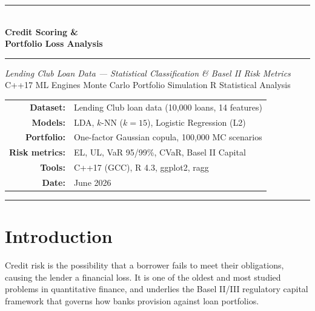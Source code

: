 \documentclass[12pt,a4paper]{article}
\begin{document}

\begin{titlepage}\centering
  \vspace*{2cm}
  {\color{darkblue}\rule{\textwidth}{2pt}}\\[0.4cm]
  {\Huge\bfseries\color{darkblue} Credit Scoring \&\\[0.3cm]Portfolio Loss Analysis}\\[0.4cm]
  {\color{midblue}\rule{\textwidth}{2pt}}
  \vspace{1.2cm}
  {\Large\itshape Lending Club Loan Data --- Statistical Classification \& Basel II Risk Metrics}
  \vspace{0.8cm}\\
  {\large\color{gray} C++17 ML Engines \quad\textbullet\quad Monte Carlo Portfolio Simulation \quad\textbullet\quad R Statistical Analysis}
  \vspace{2.5cm}

  \begin{tabular}{rl}
    \textbf{Dataset:}      & Lending Club loan data (10,000 loans, 14 features) \\[4pt]
    \textbf{Models:}       & LDA, $k$-NN ($k=15$), Logistic Regression (L2) \\[4pt]
    \textbf{Portfolio:}    & One-factor Gaussian copula, 100,000 MC scenarios \\[4pt]
    \textbf{Risk metrics:} & EL, UL, VaR 95/99\%, CVaR, Basel II Capital \\[4pt]
    \textbf{Tools:}        & C++17 (GCC), R 4.3, ggplot2, ragg \\[4pt]
    \textbf{Date:}         & June 2026
  \end{tabular}

  \vfill{\color{midblue}\rule{0.5\textwidth}{0.8pt}}
\end{titlepage}

\tableofcontents\newpage

\section{Introduction}

Credit risk is the possibility that a borrower fails to meet their obligations,
causing the lender a financial loss. It is one of the oldest and most studied
problems in quantitative finance, and underlies the Basel II/III regulatory
capital framework that governs how banks provision against loan portfolios.
\end{document}
